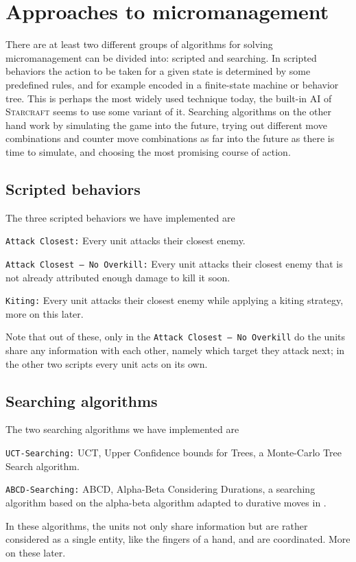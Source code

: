 \section{Approaches to micromanagement}
There are at least two different groups of algorithms for solving micromanagement can be divided into: scripted and searching.
In scripted behaviors the action to be taken for a given state is determined by some predefined rules, and for example encoded in a finite-state machine or behavior tree.
This is perhaps the most widely used technique today, the built-in AI of \textsc{Starcraft} seems to use some variant of it.
Searching algorithms on the other hand work by simulating the game into the future, trying out different move combinations and counter move combinations as far into the future as there is time to simulate, and choosing the most promising course of action.

\subsection{Scripted behaviors}
The three scripted behaviors we have implemented are
\begin{shortitem}
\item \texttt{Attack Closest:}					Every unit attacks their closest enemy.
\item \texttt{Attack Closest -- No Overkill:}	Every unit attacks their closest enemy that is not already attributed enough damage to kill it soon.
\item \texttt{Kiting:}							Every unit attacks their closest enemy while applying a kiting strategy, more on this later.
\end{shortitem}

Note that out of these, only in the \texttt{Attack Closest -- No Overkill} do the units share any information with each other, namely which target they attack next; in the other two scripts every unit acts on its own.

\subsection {Searching algorithms}
The two searching algorithms we have implemented are
\begin{shortitem}
\item \texttt{UCT-Searching:}	UCT, Upper Confidence bounds for Trees, a Monte-Carlo Tree Search algorithm.
\item \texttt{ABCD-Searching:}	ABCD, Alpha-Beta Considering Durations, a searching algorithm based on the alpha-beta algorithm adapted to durative moves in \cite{abcd}.
\end{shortitem}
In these algorithms, the units not only share information but are rather considered as a single entity, like the fingers of a hand, and are coordinated.
More on these later.
